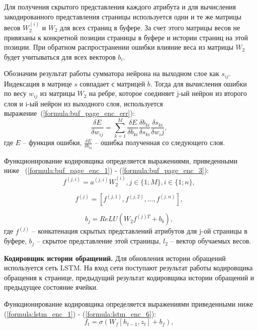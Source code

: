 Для получения скрытого представления каждого атрибута и для вычисления закодированного представления страницы используется одни и те же матрицы весов $W_2^{(i)}$ и $W_2$ для всех страниц в буфере.
За счет этого матрицы весов не привязаны к конкретной позиции страницы в буфере и истории страниц на этой позиции.
При обратном распространении ошибки влияние веса из матрицы $W_2$ будет учитываться для всех векторов $b_i$.

Обозначим результат работы сумматора нейрона на выходном слое как $s_{ij}$.
Индексация в матрице $s$ совпадает с матрицей $b$.
Тогда для вычисления ошибки по весу $w_{ij}$ из матрицы $W_2$ на ребре, которое соединяет j-ый нейрон из второго слоя и i-ый нейрон из выходного слоя, используется выражение~(\ref{formula:buf_page_enc_err}):
\begin{equation}\label{formula:buf_page_enc_err}
	\frac{\delta E}{\delta w_{ij}} = \sum\limits_{k=1}^{M}\frac{\delta E}{\delta b_{ki}}\frac{\delta b_{ki}}{\delta s_{ki}} \frac{\delta s_{ki}}{\delta w_ij},
\end{equation}
где $E$ -- функция ошибки, $\frac{\delta E}{\delta b_{ki}}$ -- ошибка полученная со следующего слоя.

Функционирование кодировщика определяется выражениями, приведенными ниже
~{(\ref{formula:buf_page_enc_1}) - (\ref{formula:buf_page_enc_3})}:
\begin{equation}\label{formula:buf_page_enc_1}
	f^{(j,i)} = a^{(j,i)}W_2^{(i)}, j \in \{1;M\}, i \in \{1;n\},
\end{equation}

\begin{equation}\label{formula:buf_page_enc_2}
	f^{(j)} = [f^{(j,1)}, f^{(j,2)}, ..., f^{(j,n)}],
\end{equation}

\begin{equation}\label{formula:buf_page_enc_3}
	b_j = ReLU(W_2f^{(j)T} + b_b),
\end{equation}
где $f^{(j)}$ -- конкатенация скрытых представлений атрибутов для j-ой страницы в буфере, $b_j$ -- скрытое представление этой страницы, $l_2$ -- вектор обучаемых весов.

\textbf{Кодировщик истории обращений.} Для обновления истории обращений используется сеть LSTM.
На вход сети поступают результат работы кодировщика обращения к странице, предыдущий результат кодировщика истории обращений и предыдущее состояние ячейки.

Функционирование кодировщика определяется выражениями приведенными ниже
(\ref{formula:lstm_enc_1}) - (\ref{formula:lstm_enc_6}):
\begin{equation}\label{formula:lstm_enc_1}
	f_t = \sigma(W_f[h_{t-1}, z_t] + b_f),
\end{equation}

